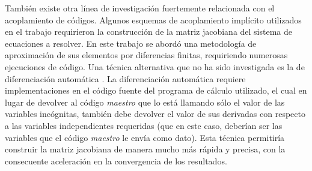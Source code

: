También existe otra línea de investigación fuertemente relacionada con el acoplamiento de códigos.
Algunos esquemas de acoplamiento implícito utilizados en el trabajo requirieron la construcción de la matriz jacobiana del sistema de ecuaciones a resolver.
En este trabajo se abordó una metodología de aproximación de sus elementos por diferencias finitas, requiriendo numerosas ejecuciones de código.
Una técnica alternativa que no ha sido investigada es la de diferenciación automática \cite{griewank-ad}.
La diferenciación automática requiere implementaciones en el código fuente del programa de cálculo utilizado,
el cual en lugar de devolver al código \textit{maestro} que lo está llamando sólo el valor de las variables incógnitas,
también debe devolver el valor de sus derivadas con respecto a las variables independientes requeridas
(que en este caso, deberían ser las variables que el código \textit{maestro} le envía como dato).
Esta técnica permitiría construir la matriz jacobiana de manera mucho más rápida y precisa,
con la consecuente aceleración en la convergencia de los resultados.
